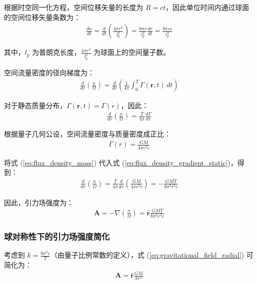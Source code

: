 \documentclass[12pt,twocolumn]{article}
\begin{document}
根据时空同一化方程，空间位移矢量的长度为 $R = ct$，因此单位时间内通过球面的空间位移矢量条数为：
\begin{align}
    \frac{dn}{dt} = \frac{d}{dt}\left(\frac{4\pi r^2}{l_p^2}\right) = \frac{8\pi r}{l_p^2} \frac{dr}{dt} = \frac{8\pi r c}{l_p^2}
    \label{eq:flux_time_rate}
\end{align}

其中，$l_p$ 为普朗克长度，$\frac{4\pi r^2}{l_p^2}$ 为球面上的空间量子数。

空间流量密度的径向梯度为：
\begin{align}
    \frac{d}{dr}\left(\frac{n}{\Omega}\right) = \frac{d}{dr}\left(\frac{1}{4\pi} \int_0^T \Gamma(\mathbf{r}, t) \, dt\right)
    \label{eq:flux_density_gradient}
\end{align}

对于静态质量分布，$\Gamma(\mathbf{r}, t) = \Gamma(r)$，因此：
\begin{align}
    \frac{d}{dr}\left(\frac{n}{\Omega}\right) = \frac{T}{4\pi} \frac{d\Gamma}{dr}
    \label{eq:flux_density_gradient_static}
\end{align}

根据量子几何公设，空间流量密度与质量密度成正比：
\begin{align}
    \Gamma(r) = \frac{G M}{4\pi r^2 c}
    \label{eq:flux_density_mass}
\end{align}

将式 (\ref{eq:flux_density_mass}) 代入式 (\ref{eq:flux_density_gradient_static})，得到：
\begin{align}
    \frac{d}{dr}\left(\frac{n}{\Omega}\right) = \frac{T}{4\pi} \frac{d}{dr}\left(\frac{G M}{4\pi r^2 c}\right) = -\frac{G M T}{8\pi^2 r^3 c}
    \label{eq:flux_density_gradient_final}
\end{align}

因此，引力场强度为：
\begin{align}
    \mathbf{A} = -\nabla\left(\frac{n}{\Omega}\right) = \hat{\mathbf{r}} \frac{G M T}{8\pi^2 r^3 c}
    \label{eq:gravitational_field_radial}
\end{align}

\subsubsection{球对称性下的引力场强度简化}

考虑到 $k = \frac{8\pi^2 c}{T}$（由量子比例常数的定义），式 (\ref{eq:gravitational_field_radial}) 可简化为：
\begin{align}
    \mathbf{A} = \hat{\mathbf{r}} \frac{G M}{k r^3}
    \label{eq:gravitational_field_simple}
\end{align}
\end{document}
